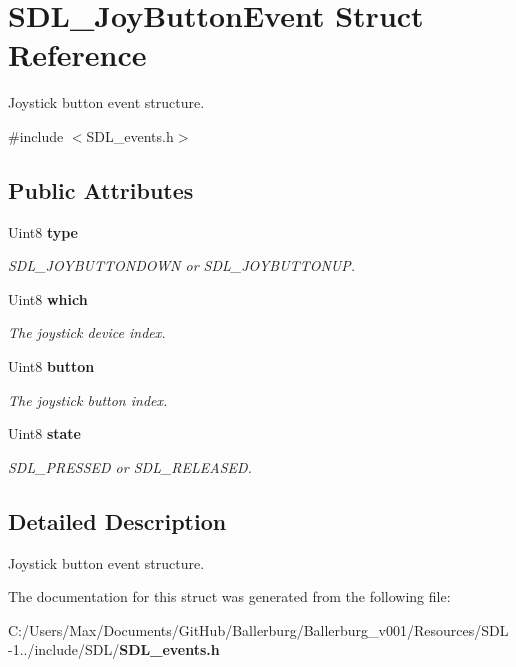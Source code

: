 \section{S\+D\+L\+\_\+\+Joy\+Button\+Event Struct Reference}
\label{struct_s_d_l___joy_button_event}


Joystick button event structure.  




{\ttfamily \#include $<$S\+D\+L\+\_\+events.\+h$>$}

\subsection*{Public Attributes}
\begin{DoxyCompactItemize}
\item 
Uint8 {\bf type}\label{struct_s_d_l___joy_button_event_a1ec5304348dc281dac6b3b70825f115e}

\begin{DoxyCompactList}\small\item\em S\+D\+L\+\_\+\+J\+O\+Y\+B\+U\+T\+T\+O\+N\+D\+O\+W\+N or S\+D\+L\+\_\+\+J\+O\+Y\+B\+U\+T\+T\+O\+N\+U\+P. \end{DoxyCompactList}\item 
Uint8 {\bf which}\label{struct_s_d_l___joy_button_event_a853258976673fceb8cd7340260b3823d}

\begin{DoxyCompactList}\small\item\em The joystick device index. \end{DoxyCompactList}\item 
Uint8 {\bf button}\label{struct_s_d_l___joy_button_event_a73ebe4261cf80564052af9c1af737a4d}

\begin{DoxyCompactList}\small\item\em The joystick button index. \end{DoxyCompactList}\item 
Uint8 {\bf state}\label{struct_s_d_l___joy_button_event_ad3b6f8d9aa2c5e694f664b97d12bcd2b}

\begin{DoxyCompactList}\small\item\em S\+D\+L\+\_\+\+P\+R\+E\+S\+S\+E\+D or S\+D\+L\+\_\+\+R\+E\+L\+E\+A\+S\+E\+D. \end{DoxyCompactList}\end{DoxyCompactItemize}


\subsection{Detailed Description}
Joystick button event structure. 

The documentation for this struct was generated from the following file\+:\begin{DoxyCompactItemize}
\item 
C\+:/\+Users/\+Max/\+Documents/\+Git\+Hub/\+Ballerburg/\+Ballerburg\+\_\+v001/\+Resources/\+S\+D\+L-\/1../include/\+S\+D\+L/{\bf S\+D\+L\+\_\+events.\+h}\end{DoxyCompactItemize}
